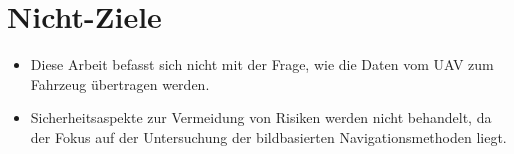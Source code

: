 \section{Nicht-Ziele}

\begin{itemize}
    \item Diese Arbeit befasst sich nicht mit der Frage, wie die Daten vom \ac{UAV} zum Fahrzeug übertragen werden.
    \item Sicherheitsaspekte zur Vermeidung von Risiken werden nicht behandelt, da der Fokus auf der Untersuchung der bildbasierten Navigationsmethoden liegt.
\end{itemize}
